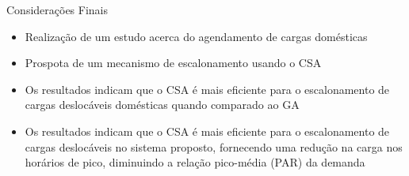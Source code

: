 \begin{frame}
  \begin{block}{Considerações Finais}
  \begin{itemize}
    \item \small Realização de um estudo acerca do agendamento de cargas domésticas
    \item \small Prospota de um mecanismo de escalonamento usando o CSA
    \item \small Os resultados indicam que o CSA é mais eficiente para o escalonamento de cargas deslocáveis domésticas quando comparado ao GA
    \item \small Os resultados indicam que o CSA é mais eficiente para o escalonamento de cargas deslocáveis no sistema proposto, fornecendo uma redução na carga nos horários de pico, diminuindo a relação pico-média (PAR) da demanda
  \end{itemize}
  \end{block}
\end{frame}




